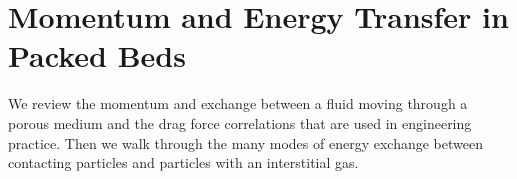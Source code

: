 \chapter{Momentum and Energy Transfer in Packed Beds}\label{sec:survey-packed-beds}
We review the momentum and exchange between a fluid moving through a porous medium and the drag force correlations that are used in engineering practice. Then we walk through the many modes of energy exchange between contacting particles and particles with an interstitial gas.


